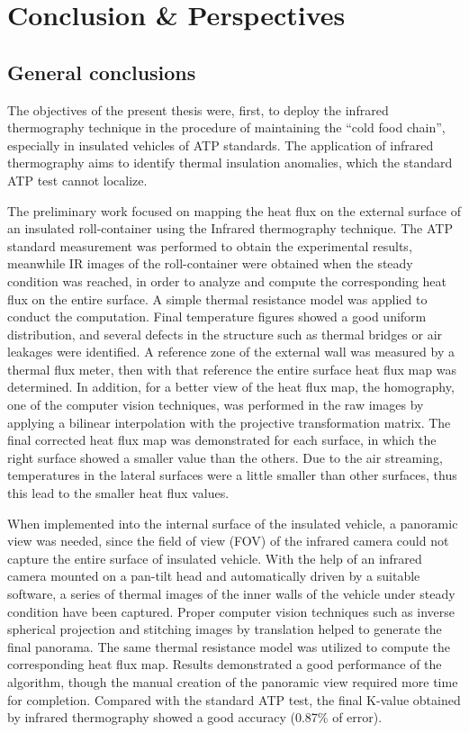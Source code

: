 \chapter{Conclusion \& Perspectives}         %

\section{General conclusions}
The objectives of the present thesis were, first, to deploy the infrared thermography technique in the procedure of maintaining the ``cold food chain'', especially in insulated vehicles of ATP standards. The application of infrared thermography aims to identify thermal insulation anomalies, which the standard ATP test cannot localize. 

The preliminary work focused on mapping the heat flux on the external surface of an insulated roll-container using the Infrared thermography technique. The ATP standard measurement was performed to obtain the experimental results, meanwhile IR images of the roll-container were obtained when the steady condition was reached, in order to analyze and compute the corresponding heat flux on the entire surface. A simple thermal resistance model was applied to conduct the computation. Final temperature figures showed a good uniform distribution, and several defects in the structure such as thermal bridges or air leakages were identified. A reference zone of the external wall was measured by a thermal flux meter, then with that reference the entire surface heat flux map was determined. In addition, for a better view of the heat flux map, the homography, one of the computer vision techniques, was performed in the raw images by applying a bilinear interpolation with the projective transformation matrix. The final corrected heat flux map was demonstrated for each surface, in which the right surface showed a smaller value than the others.  Due to the air streaming, temperatures in the lateral surfaces were a little smaller than other surfaces, thus this lead to the smaller heat flux values.

When implemented into the internal surface of the insulated vehicle, a panoramic view was needed, since the field of view (FOV) of the infrared camera could not capture the entire surface of insulated vehicle. With the help of an infrared camera mounted on a pan-tilt head and automatically driven by a suitable software, a series of thermal images of the inner walls of the vehicle under steady condition have been captured. Proper computer vision techniques such as inverse spherical projection and stitching images by translation helped to generate the final panorama. The same thermal resistance model was utilized to compute the corresponding heat flux map. Results demonstrated a good performance of the algorithm, though the manual creation of the panoramic view required more time for completion. Compared with the standard ATP test, the final K-value obtained by infrared thermography showed a good accuracy (0.87\% of error).

